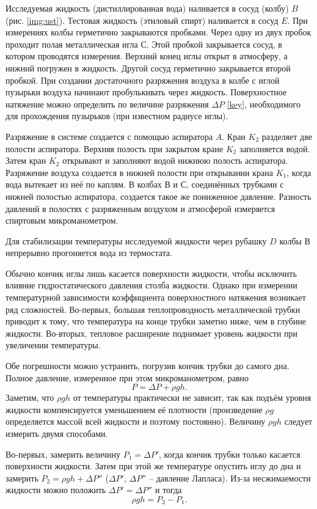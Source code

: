 \documentclass[a4paper, 12pt]{article}
\begin{document}
	Исследуемая жидкость (дистиллированная вода) наливается в сосуд (колбу) $ B $ (рис. \eqref{img:ust}). Тестовая жидкость  (этиловый спирт) наливается  в сосуд $ E $.  При измерениях  колбы герметично закрываются  пробками. Через одну из двух пробок  проходит полая металлическая игла $ С $. Этой пробкой закрывается сосуд, в котором  проводятся измерения. Верхний конец иглы открыт в атмосферу, а нижний погружен в жидкость. Другой сосуд герметично закрывается второй пробкой. При создании достаточного  разряжения воздуха в колбе с иглой пузырьки воздуха начинают пробулькивать через жидкость. Поверхностное натяжение можно определить по величине разряжения $ \Delta P $ \eqref{key}, необходимого для прохождения пузырьков (при известном радиусе иглы).

	Разряжение в системе создается с помощью аспиратора $ A $. Кран $ K_2 $ разделяет две полости аспиратора. Верхняя полость при закрытом кране $ K_2 $ заполняется водой. Затем кран $ K_2 $ открывают и заполняют водой  нижнюю полость  аспиратора.  Разряжение воздуха создается в нижней полости  при открывании крана $ K_1 $, когда  вода вытекает из неё по каплям. В колбах $ В $ и $ С $, соединённых трубками с нижней полостью аспиратора, создается такое же пониженное давление. Разность давлений в полостях с разряженным воздухом и атмосферой измеряется спиртовым микроманометром.

	Для стабилизации температуры исследуемой жидкости через рубашку $ D $ колбы $ В $ непрерывно прогоняется вода из термостата.

	Обычно кончик иглы лишь касается поверхности жидкости, чтобы исключить влияние гидростатического давления столба жидкости. Однако при измерении температурной зависимости коэффициента поверхностного натяжения возникает ряд сложностей. Во-первых, большая теплопроводность металлической трубки приводит к тому, что температура на конце трубки заметно ниже, чем в глубине жидкости. Во-вторых, тепловое расширение поднимает уровень жидкости при увеличении температуры.

	Обе погрешности можно устранить, погрузив кончик трубки до самого дна. Полное давление, измеренное при этом микроманометром, равно \[ P = \Delta P + \rho g h.\] Заметим, что $ \rho gh $ от температуры практически не зависит, так как подъём уровня жидкости компенсируется уменьшением её плотности (произведение $ \rho g $ определяется массой всей жидкости и поэтому постоянно). Величину  $ \rho g h $ следует измерить двумя способами.

	Во-первых, замерить величину $ P_1= \Delta P' $, когда кончик трубки только касается поверхности жидкости. Затем при этой же температуре опустить иглу до дна и замерить $ P_2= \rho gh + \Delta P'' $ ($ \Delta P' $, $ \Delta P'' $ -- давление Лапласа). Из-за  несжимаемости  жидкости можно положить $ \Delta P' = \Delta P'' $ и тогда \[ \rho gh= P_2 - P_1. \]
\end{document}
